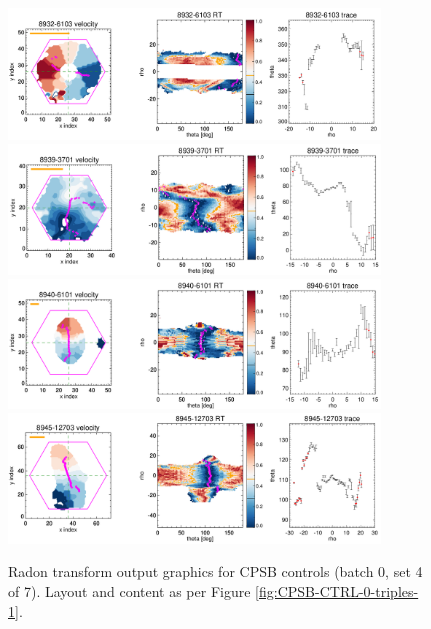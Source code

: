 \documentclass[fleqn,usenatbib]{mnras}
\begin{document}
\begin{figure}
    \centering
    \includegraphics[width=0.88\textwidth]{Images/SN1-MC250/CPSB-CTRL-triples/CPSB-CTRL-8932-6103-1-250.png}
    \includegraphics[width=0.88\textwidth]{Images/SN1-MC250/CPSB-CTRL-triples/CPSB-CTRL-8939-3701-1-250.png}
    \includegraphics[width=0.88\textwidth]{Images/SN1-MC250/CPSB-CTRL-triples/CPSB-CTRL-8940-6101-1-250.png}
    \includegraphics[width=0.88\textwidth]{Images/SN1-MC250/CPSB-CTRL-triples/CPSB-CTRL-8945-12703-1-250.png}    
    \caption{Radon transform output graphics for CPSB controls (batch 0, set 4 of 7). Layout and content as per Figure \ref{fig:CPSB-CTRL-0-triples-1}.}
    \label{fig:CPSB-CTRL-0-triples-4}
\end{figure}
\end{document}
